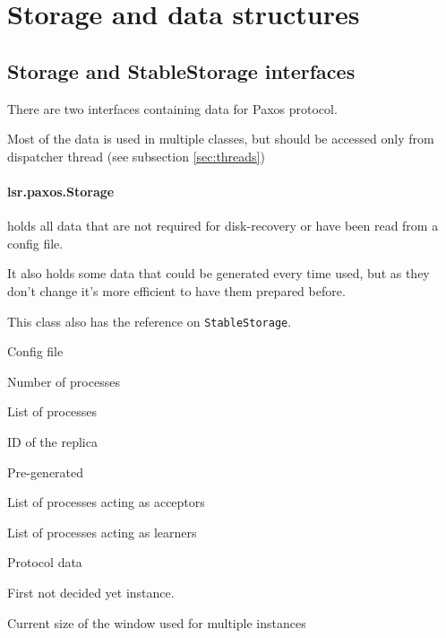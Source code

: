 \section{Storage and data structures}
\label{sec:storage_and_data_structures}

\subsection{Storage and StableStorage interfaces}
\label{subsubsec:storage_and_stablestorage_interfaces}

There are two interfaces containing data for Paxos protocol.

Most of the data is used in multiple classes, but should be accessed only from dispatcher thread (see subsection \ref{sec:threads})

\paragraph{\normalfont \ttfamily lsr.paxos.Storage}
holds all data that are not required for disk-recovery or have been read from a config file.

It also holds some data that could be generated every time used, but as they don't change it's more efficient to have them prepared before.

This class also has the reference on \texttt{StableStorage}.

\begin{description}
\setlength{\itemindent}{0pt}
  \item[]{\tiny\vspace{-0.5em}Config file\vspace{-0.5em}}
    \item[n] Number of processes 
    \item[processes] List of processes
    \item[localID] ID of the replica
  \item[]{\tiny\vspace{-0.5em}Pre-generated\vspace{-0.5em}}
    \item[acceptors] List of processes acting as acceptors
    \item[learners]  List of processes acting as learners
  \item[]{\tiny\vspace{-0.5em}Protocol data\vspace{-0.5em}}
    \item[firstUncommited] First not decided yet instance.
    \item[windowSize] Current size of the window used for multiple instances
\end{description}


